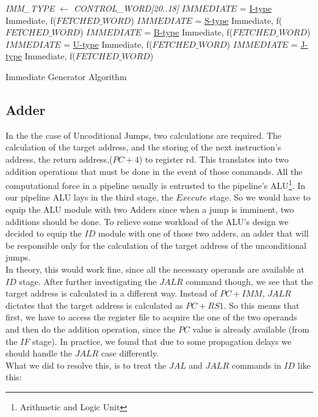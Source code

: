 \clearpage

\begin{algorithm}[H]
	\SetAlgoLined
	
	\BlankLine
	
	\emph{IMM\_TYPE $\leftarrow$ CONTROL\_WORD[20..18]}\;
	 { {\small $IMMEDIATE$ =  \underline{I-type} Immediate, f(\footnotesize{$FETCHED\_WORD$})} \;}
	 { {\small $IMMEDIATE$ =  \underline{S-type} Immediate, f(\footnotesize{$FETCHED\_WORD$})} \;}
	 { {\small $IMMEDIATE$ =  \underline{B-type} Immediate, f(\footnotesize{$FETCHED\_WORD$})} \;}
	 { {\small $IMMEDIATE$ =  \underline{U-type} Immediate, f(\footnotesize{$FETCHED\_WORD$})} \;}
	 { {\small $IMMEDIATE$ =  \underline{J-type} Immediate, f(\footnotesize{$FETCHED\_WORD$})} \;}
	
	\caption{Immediate Generator Algorithm}
	\label{Algorithm1}
\end{algorithm}	
\vspace{5mm}

\subsection{\textcolor{byzantium}{Adder}}
\label{SubSec3.2.5:ADDER}

In the the case of Uncoditional Jumps, two calculations are required. The calculation of the target address, and the storing of the next instruction's address, the return address,($PC+4$) to register rd. This translates into two addition operations that must be done in the event of those commands. All the computational force in a pipeline usually is entrusted to the pipeline's ALU\footnote{Arithmetic and Logic Unit}. In our pipeline ALU lays in the third stage, the $Execute$ stage. So we would have to equip the ALU module with two Adders since when a jump is imminent, two additions should be done. To relieve some workload of the ALU's design we decided to equip the $ID$ module with one of those two adders, an adder that will be responsible only for the calculation of the target address of the unconditional jumps. \\

In theory, this would work fine, since all the necessary operands are available at $ID$ stage. After further investigating the $JALR$ command though, we see that the target address is calculated in a different way. Instead of $PC+IMM$, $JALR$ dictates that the target address is calculated as $PC+RS1$. So this means that first, we have to access the register file to acquire the one of the two operands and then do the addition operation, since the $PC$ value is already available (from the $IF$ stage). In practice, we found that due to some propagation delays we should handle the $JALR$ case differently. \\ 
\clearpage
What we did to resolve this, is to treat the $JAL$ and $JALR$ commands in $ID$ like this:

